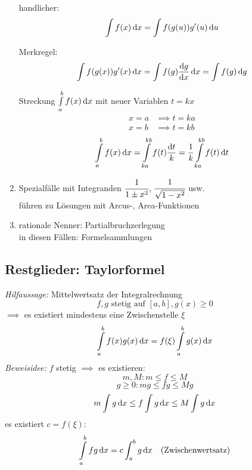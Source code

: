 \begin{enumerate}
		handlicher:
		\begin{equation*}
			\int f(x) \,\mathrm d x = \int f(g(u)) g'(u) \,\mathrm d u
		\end{equation*}	
		
		Merkregel:
		\begin{equation*}
			\int f(g(x)) g'(x) \,\mathrm d x = \int f(g) \frac{\mathrm d g}{\mathrm d x} \,\mathrm d x = \int f(g) \,\mathrm d g
		\end{equation*}
		
		\begin{example}
			Streckung $\int\limits_a^b f(x) \,\mathrm d x$ mit neuer Variablen $t = k x$
			\begin{align*}
				x = a &\implies t = ka \\
				x = b &\implies t = kb
			\end{align*}
			\begin{equation*}
				\int\limits_a^b f(x) \,\mathrm d x = \int\limits_{ka}^{kb} f(t) \frac{\mathrm d t}{k} = \frac{1}{k} \int\limits_{ka}^{kb} f(t) \,\mathrm d t
			\end{equation*}
		\end{example}
		
	\item Spezialfälle mit Integranden $ \cfrac{1}{1\pm x^2}$, $\cfrac{1}{\sqrt{1-x^2}}$ usw. \\
		führen zu Lösungen mit Arcus-, Area-Funktionen
		
	\item rationale Nenner: Partialbruchzerlegung \\
		in diesen Fällen: Formelsammlungen
\end{enumerate}
		
\subsection{Restglieder: Taylorformel}
\label{sec:integr_taylor}
\emph{Hilfaussage:} Mittelwertsatz der Integralrechnung
\begin{equation*}
	f, g \text{ stetig auf } [a, b], g(x) \geq 0
\end{equation*}
$\implies$ es existiert mindestens eine Zwischenstelle $\xi$
\begin{equation*}
	\int\limits_a^b f(x) g(x) \,\mathrm d x = f(\xi) \int\limits_a^b g(x) \,\mathrm d x
\end{equation*}
%
\emph{Beweisidee:} $f$ stetig $\implies$ es existieren:
\[ m, M: m \leq f \leq M \]
\[ g \geq 0: mg \leq fg \leq Mg \]
\[ m \int g \,\mathrm d x \leq f \int g \,\mathrm d x \leq M \int g \,\mathrm d x \]
es existiert $c = f(\xi)$:
\[ \int\limits_a^b fg \,\mathrm d x = c \int_a^b g \,\mathrm d x \quad\text{(Zwischenwertsatz)} \]
	
